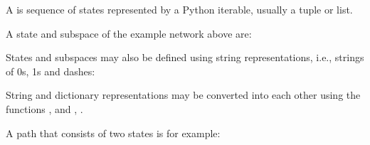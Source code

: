 \documentclass[letterpaper,10pt,english]{sphinxmanual}
\begin{document}
A  is sequence of states represented by a Python iterable, usually a tuple or list.

A state and subspace of the example network above are:

\begin{sphinxVerbatim}[commandchars=\\\{\}]
  
  
\end{sphinxVerbatim}

States and subspaces may also be defined using string representations, i.e., strings of 0s, 1s and dashes:

\begin{sphinxVerbatim}[commandchars=\\\{\}]
  
  
\end{sphinxVerbatim}

String and dictionary representations may be converted into each other using the functions
{\hyperref[\detokenize{StateTransitionGraphs:state2str}]{}}, {\hyperref[\detokenize{StateTransitionGraphs:state2dict}]{}} and {\hyperref[\detokenize{StateTransitionGraphs:subspace2str}]{}}, {\hyperref[\detokenize{StateTransitionGraphs:subspace2dict}]{}}.

A path that consists of two states is for example:
\end{document}
